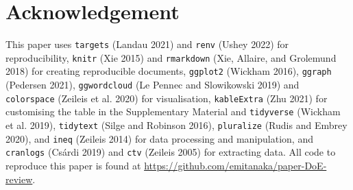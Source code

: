 \documentclass{article}
\begin{document}
\hypertarget{pkgs}{%
\section{Acknowledgement}\label{pkgs}}

This paper uses \texttt{targets} (Landau 2021) and \texttt{renv} (Ushey
2022) for reproducibility, \texttt{knitr} (Xie 2015) and
\texttt{rmarkdown} (Xie, Allaire, and Grolemund 2018) for creating
reproducible documents, \texttt{ggplot2} (Wickham 2016), \texttt{ggraph}
(Pedersen 2021), \texttt{ggwordcloud} (Le Pennec and Slowikowski 2019)
and \texttt{colorspace} (Zeileis et al. 2020) for visualisation,
\texttt{kableExtra} (Zhu 2021) for customising the table in the
Supplementary Material and \texttt{tidyverse} (Wickham et al. 2019),
\texttt{tidytext} (Silge and Robinson 2016), \texttt{pluralize} (Rudis
and Embrey 2020), and \texttt{ineq} (Zeileis 2014) for data processing
and manipulation, and \texttt{cranlogs} (Csárdi 2019) and \texttt{ctv}
(Zeileis 2005) for extracting data. All code to reproduce this paper is
found at \url{https://github.com/emitanaka/paper-DoE-review}.
\end{document}
